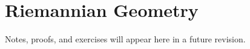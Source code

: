 \section{Riemannian Geometry}

\begin{remark*}[Status]
Notes, proofs, and exercises will appear here in a future revision.
\end{remark*}